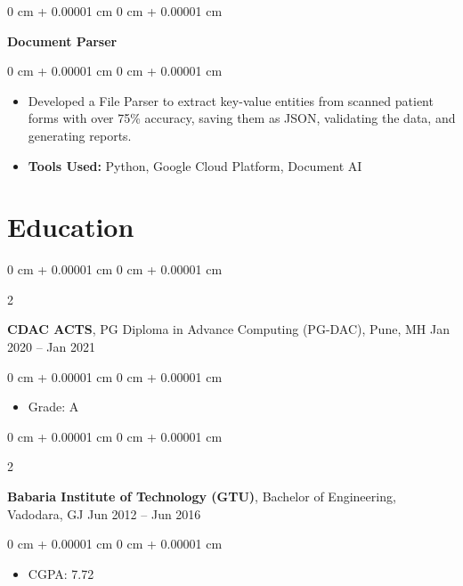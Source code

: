 \documentclass[10pt, letterpaper]{article}
\newenvironment{highlights}{
    \begin{itemize}[
        topsep=0.10 cm,
        parsep=0.10 cm,
        partopsep=0pt,
        itemsep=0pt,
        leftmargin=0 cm + 10pt
    ]
}{
    \end{itemize}
} %
\newenvironment{onecolentry}{
    \begin{adjustwidth}{
        0 cm + 0.00001 cm
    }{
        0 cm + 0.00001 cm
    }
}{
    \end{adjustwidth}
} %
\newenvironment{twocolentry}[2][]{
    \onecolentry
    \def\secondColumn{#2}
    \setcolumnwidth{\fill, 4.5 cm}
    \begin{paracol}{2}
}{
    \switchcolumn \raggedleft \secondColumn
    \end{paracol}
    \endonecolentry
} %
\begin{document}
        \vspace{0.3 cm}

        \begin{onecolentry}
            \textbf{Document Parser}
        \end{onecolentry}

        \vspace{0.10 cm}
        \begin{onecolentry}
            \begin{highlights}
                \item Developed a File Parser to extract key-value entities from scanned patient forms with over 75\% accuracy, saving them as JSON, validating the data, and generating reports.
                \item \textbf{Tools Used:} Python, Google Cloud Platform, Document AI
            \end{highlights}
        \end{onecolentry}


        \vspace{0.2 cm}

    
    \section{Education}
        
        \begin{twocolentry}{
            Jan 2020 – Jan 2021
        }
        \textbf{CDAC ACTS}, PG Diploma in Advance Computing (PG-DAC), Pune, MH \end{twocolentry}

        \vspace{0.10 cm}
        \begin{onecolentry}
            \begin{highlights}
                \item Grade: A 
            \end{highlights}

        \end{onecolentry}

        \vspace{0.20 cm}

        \begin{twocolentry}{
            Jun 2012 – Jun 2016
        }
            \textbf{Babaria Institute of Technology (GTU)}, Bachelor of Engineering, Vadodara, GJ\end{twocolentry}

        \vspace{0.10 cm}
        \begin{onecolentry}
            \begin{highlights}
                \item CGPA: 7.72 
            \end{highlights}
            
        \end{onecolentry}

    
\end{document}
